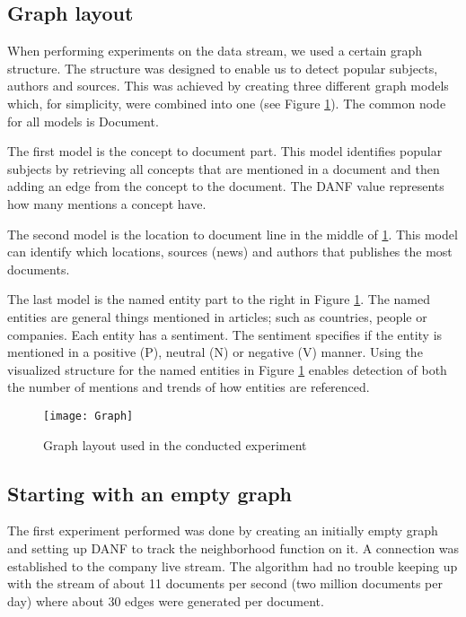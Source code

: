 \subsection{Graph layout}

When performing experiments on the data stream, we used a certain graph structure. The structure was designed to enable us to detect popular subjects, authors and sources. This was achieved by creating three different graph models which, for simplicity, were combined into one (see Figure \ref{fig:experiment-graph}). The common node for all models is Document. 

The first model is the concept to document part. This model identifies popular subjects by retrieving all concepts that are mentioned in a document and then adding an edge from the concept to the document. The DANF value represents how many mentions a concept have. 

The second model is the location to document line in the middle of \ref{fig:experiment-graph}. This model can identify which locations, sources (news) and authors that publishes the most documents.

The last model is the named entity part to the right in Figure \ref{fig:experiment-graph}. The named entities are general things mentioned in articles; such as countries, people or companies. Each entity has a sentiment. The sentiment specifies if the entity is mentioned in a positive (P), neutral (N) or negative (V) manner. Using the visualized structure for the named entities in Figure \ref{fig:experiment-graph} enables detection of both the number of mentions and trends of how entities are referenced.

\begin{figure}[h]
\centering
\texttt{[image: Graph]}    
\captionsetup{justification=centering}
\caption {Graph layout used in the conducted experiment}
\label{fig:experiment-graph}
\end{figure}


\subsection{Starting with an empty graph}

The first experiment performed was done by creating an initially empty graph and setting up DANF to track the neighborhood function on it. A connection was established to the company live stream. The algorithm had no trouble keeping up with the stream of about 11 documents per second (two million documents per day) where about 30 edges were generated per document. 

